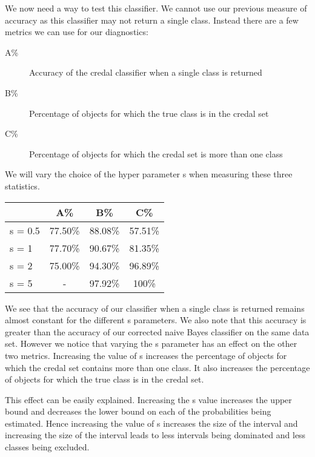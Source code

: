 We now need a way to test this classifier.
We cannot use our previous measure of accuracy as this classifier may not return a single class.
Instead there are a few metrics we can use for our diagnostics:
\begin{description}
	\item[A\%] Accuracy of the credal classifier when a single class is returned
	\item[B\%] Percentage of objects for which the true class is in the credal set
	\item[C\%] Percentage of objects for which the credal set is more than one class
\end{description}

We will vary the choice of the hyper parameter s when measuring these three statistics.
\begin{center}
\begin{tabular}{l|c c c}
        & A\%     & B\%     & C\%     \\
\hline
s = 0.5 & 77.50\% & 88.08\% & 57.51\% \\
s = 1   & 77.70\% & 90.67\% & 81.35\% \\
s = 2   & 75.00\% & 94.30\% & 96.89\% \\
s = 5   & -       & 97.92\% & 100\%   \\
\end{tabular}
\end{center}

We see that the accuracy of our classifier when a single class is returned remains almost constant for the different s parameters.
We also note that this accuracy is greater than the accuracy of our corrected naive Bayes classifier on the same data set.
However we notice that varying the s parameter has an effect on the other two metrics.
Increasing the value of s increases the percentage of objects for which the credal set contains more than one class.
It also increases the percentage of objects for which the true class is in the credal set.

This effect can be easily explained.
Increasing the s value increases the upper bound and decreases the lower bound on each of the probabilities being estimated.
Hence increasing the value of s increases the size of the interval and increasing the size of the interval leads to less intervals being dominated and less classes being excluded.